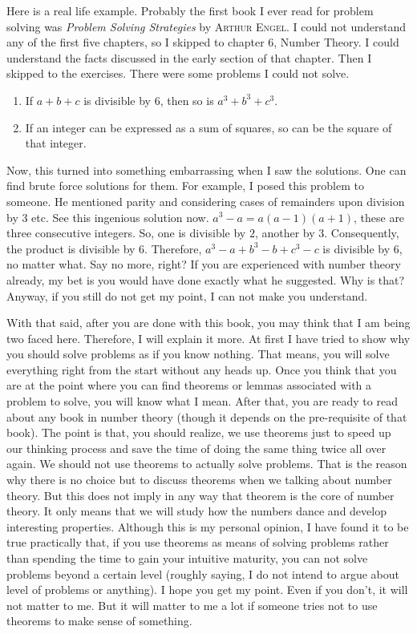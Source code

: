 \documentclass[a4paper, leqno]{article}
\theoremstyle{definition}
\theoremstyle{remark}
\begin{document}
		Here is a real life example. Probably the first book I ever read for problem solving was \textit{Problem Solving Strategies} by \textsc{Arthur Engel}. I could not understand any of the first five chapters, so I skipped to chapter $6$, Number Theory. I could understand the facts discussed in the early section of that chapter. Then I skipped to the exercises. There were some problems I could not solve.
			\begin{enumerate}
				\item If $a+b+c$ is divisible by $6$, then so is $a^3+b^3+c^3$.
				\item If an integer can be expressed as a sum of squares, so can be the square of that integer.
			\end{enumerate}
		Now, this turned into something embarrassing when I saw the solutions. One can find brute force solutions for them. For example, I posed this problem to someone. He mentioned parity and considering cases of remainders upon division by $3$ etc. See this ingenious solution now. $a^3-a=a(a-1)(a+1)$, these are three consecutive integers. So, one is divisible by $2$, another by $3$. Consequently, the product is divisible by $6$. Therefore, $a^3-a+b^3-b+c^3-c$ is divisible by $6$, no matter what. Say no more, right? If you are experienced with number theory already, my bet is you would have done exactly what he suggested. Why is that? Anyway, if you still do not get my point, I can not make you understand.
		
		With that said, after you are done with this book, you may think that I am being two faced here. Therefore, I will explain it more. At first I have tried to show why you should solve problems as if you know nothing. That means, you will solve everything right from the start without any heads up. Once you think that you are at the point where you can find theorems or lemmas associated with a problem to solve, you will know what I mean. After that, you are ready to read about any book in number theory (though it depends on the pre-requisite of that book). The point is that, you should realize, we use theorems just to speed up our thinking process and save the time of doing the same thing twice all over again. We should not use theorems to actually solve problems. That is the reason why there is no choice but to discuss theorems when we talking about number theory. But this does not imply in any way that theorem is the core of number theory. It only means that we will study how the numbers dance and develop interesting properties. Although this is my personal opinion, I have found it to be true practically that, if you use theorems as means of solving problems rather than spending the time to gain your intuitive maturity, you can not solve problems beyond a certain level (roughly saying, I do not intend to argue about level of problems or anything). I hope you get my point. Even if you don't, it will not matter to me. But it will matter to me a lot if someone tries not to use theorems to make sense of something.
		
\end{document}
